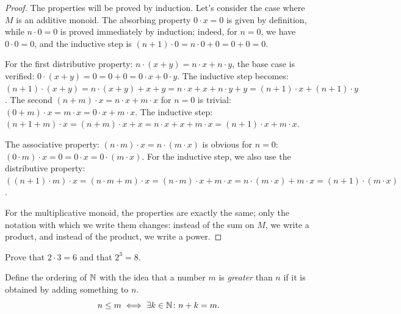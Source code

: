 \begin{proof}
The properties will be proved by induction.
Let's consider the case where $M$ is an additive monoid.
The absorbing property $0\cdot x = 0$ is given by definition,
while $n\cdot 0 = 0$ is proved immediately 
by induction; indeed, for $n=0$, we have $0\cdot 0 = 0$, 
and the inductive step is $(n+1)\cdot 0 = n\cdot 0 + 0 = 0 + 0 = 0$.

For the first distributive property: $n\cdot (x+y)=n\cdot x + n\cdot y$,
the base case is verified: $0\cdot(x+y) = 0 = 0 + 0 = 0\cdot x + 0\cdot y$.
The inductive step becomes: 
$(n+1)\cdot(x+y)
=n\cdot(x+y)+x+y
=n\cdot x + x + n\cdot y + y 
=(n+1)\cdot x + (n+1)\cdot y$.
The second $(n+m)\cdot x = n\cdot x + m\cdot x$
for $n=0$ is trivial: $(0+m)\cdot x = m\cdot x = 0\cdot x + m\cdot x$.
The inductive step:
$(n+1+m)\cdot x = (n+m)\cdot x + x 
= n\cdot x + x + m\cdot x
= (n+1)\cdot x + m\cdot x$.

The associative property: $(n\cdot m)\cdot x = n\cdot (m\cdot x)$
is obvious for $n=0$: $(0\cdot m)\cdot x = 0 = 0\cdot x = 0\cdot (m\cdot x)$.
For the inductive step, we also use the distributive property:
$((n+1)\cdot m)\cdot x 
= (n\cdot m+m)\cdot x 
= (n\cdot m)\cdot x + m\cdot x
= n\cdot (m\cdot x)+m\cdot x
= (n+1)\cdot (m\cdot x)$.

For the multiplicative monoid, the properties are exactly 
the same; only the notation with which we write them changes:
instead of the sum on $M$, we write a product, and instead of the product, 
we write a power. 
\end{proof}

\begin{exercise}
  Prove that $2\cdot 3 = 6$ and that $2^3 = 8$.
\end{exercise}
  
Define the ordering of ${\mathbb N}$ 
with the idea that a number $m$ is \emph{greater} than $n$ 
if it is obtained by adding something to $n$.
%
%
\[
    n\le m \iff \exists k\in {\mathbb N} \colon n+k = m.
\]

